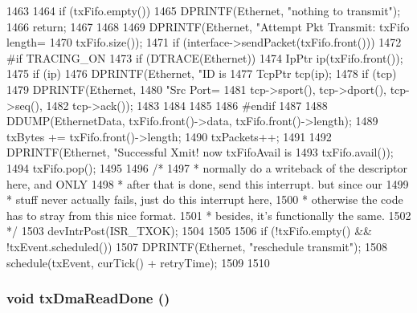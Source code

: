 \begin{DoxyCode}
1463 {
1464     if (txFifo.empty()) {
1465         DPRINTF(Ethernet, "nothing to transmit\n");
1466         return;
1467     }
1468 
1469     DPRINTF(Ethernet, "Attempt Pkt Transmit: txFifo length=%
1470             txFifo.size());
1471     if (interface->sendPacket(txFifo.front())) {
1472 #if TRACING_ON
1473         if (DTRACE(Ethernet)) {
1474             IpPtr ip(txFifo.front());
1475             if (ip) {
1476                 DPRINTF(Ethernet, "ID is %
1477                 TcpPtr tcp(ip);
1478                 if (tcp) {
1479                     DPRINTF(Ethernet,
1480                             "Src Port=%
1481                             tcp->sport(), tcp->dport(), tcp->seq(),
1482                             tcp->ack());
1483                 }
1484             }
1485         }
1486 #endif
1487 
1488         DDUMP(EthernetData, txFifo.front()->data, txFifo.front()->length);
1489         txBytes += txFifo.front()->length;
1490         txPackets++;
1491 
1492         DPRINTF(Ethernet, "Successful Xmit! now txFifoAvail is %
1493                 txFifo.avail());
1494         txFifo.pop();
1495 
1496         /*
1497          * normally do a writeback of the descriptor here, and ONLY
1498          * after that is done, send this interrupt.  but since our
1499          * stuff never actually fails, just do this interrupt here,
1500          * otherwise the code has to stray from this nice format.
1501          * besides, it's functionally the same.
1502          */
1503         devIntrPost(ISR_TXOK);
1504     }
1505 
1506    if (!txFifo.empty() && !txEvent.scheduled()) {
1507        DPRINTF(Ethernet, "reschedule transmit\n");
1508        schedule(txEvent, curTick() + retryTime);
1509    }
1510 }
\end{DoxyCode}
\hypertarget{classNSGigE_a440664c31d5692df3612ac03e709745f}{
\subsubsection[{txDmaReadDone}]{\setlength{\rightskip}{0pt plus 5cm}void txDmaReadDone ()}}
\label{classNSGigE_a440664c31d5692df3612ac03e709745f}



